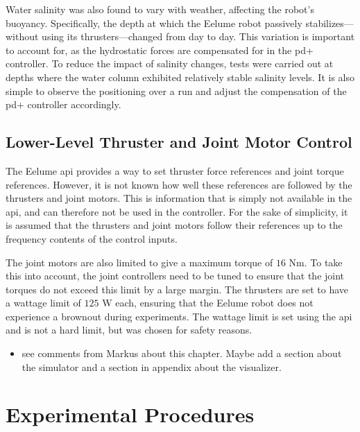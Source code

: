 Water salinity was also found to vary with weather, affecting the robot's 
buoyancy. Specifically, the depth at which the Eelume robot passively 
stabilizes—without using its thrusters—changed from day to day. This variation 
is important to account for, as the hydrostatic forces are compensated for in 
the \gls{pd+} controller. To reduce the impact of salinity changes, tests were 
carried out at depths where the water column exhibited relatively stable 
salinity levels. It is also simple to observe the positioning over a run
and adjust the compensation of the \gls{pd+} controller accordingly.

\subsection*{Lower-Level Thruster and Joint Motor Control}
The Eelume \gls{api} provides a way to set thruster force references and joint
torque references. However, it is not known how well these references are
followed by the thrusters and joint motors. This is information that is simply
not available in the \gls{api}, and can therefore not be used in the controller.
For the sake of simplicity, it is assumed that the thrusters and joint motors
follow their references up to the frequency contents of the control inputs.

The joint motors are also limited to give a maximum torque of \(16\) Nm. To take
this into account, the joint controllers need to be tuned to ensure that the
joint torques do not exceed this limit by a large margin. The thrusters are set
to have a wattage limit of \(125\) W each, ensuring that the Eelume robot does
not experience a brownout during experiments. The wattage limit is set using the
\gls{api} and is not a hard limit, but was chosen for safety reasons.

{
    \color{red}
    \begin{itemize}
        \item see comments from Markus about this chapter. Maybe add a section about the
            simulator and a section in appendix about the visualizer.
    \end{itemize}
}

\section{Experimental Procedures}

